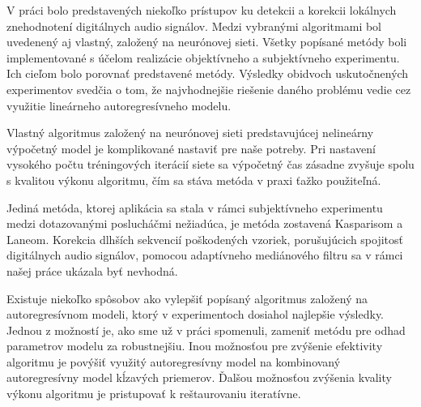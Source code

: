 
V práci bolo predstavených niekoľko prístupov ku detekcii a korekcii lokálnych znehodnotení digitálnych audio signálov. Medzi vybranými algoritmami bol uvedenený aj vlastný, založený na neurónovej sieti. Všetky popísané metódy boli implementované s účelom realizácie objektívneho a subjektívneho experimentu. Ich cieľom bolo porovnať predstavené metódy. Výsledky obidvoch uskutočnených experimentov svedčia o tom, že najvhodnejšie riešenie daného problému vedie cez využitie lineárneho autoregresívneho modelu.

Vlastný algoritmus založený na neurónovej sieti predstavujúcej nelineárny výpočetný model je komplikované nastaviť pre naše potreby. Pri nastavení vysokého počtu tréningových iterácií siete sa výpočetný čas zásadne zvyšuje spolu s kvalitou výkonu algoritmu, čím sa stáva metóda v praxi ťažko použiteľná.

Jediná metóda, ktorej aplikácia sa stala v rámci subjektívneho experimentu medzi dotazovanými poslucháčmi nežiadúca, je metóda zostavená Kasparisom a Laneom. Korekcia dlhších sekvencií poškodených vzoriek, porušujúcich spojitosť digitálnych audio signálov, pomocou adaptívneho mediánového filtru sa v rámci našej práce ukázala byť nevhodná.

Existuje niekoľko spôsobov ako vylepšiť popísaný algoritmus založený na autoregresívnom modeli, ktorý v experimentoch dosiahol najlepšie výsledky. Jednou z možností je, ako sme už v práci spomenuli, zameniť metódu pre odhad parametrov modelu za robustnejšiu. Inou možnosťou pre zvýšenie efektivity algoritmu je povýšiť využitý autoregresívny model na kombinovaný autoregresívny model kĺzavých priemerov. Ďalšou možnosťou zvýšenia kvality výkonu algoritmu je pristupovať k reštaurovaniu iteratívne.

